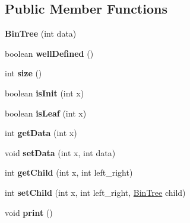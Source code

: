 \subsection*{Public Member Functions}
\begin{DoxyCompactItemize}
\item 
\mbox{\label{classdomini_1_1utils_1_1BinTree_a83904c6ebf931ba29a134be5f29a66c7}} 
{\bfseries Bin\+Tree} (int data)
\item 
\mbox{\label{classdomini_1_1utils_1_1BinTree_a742c520d5bff9a17a4cd56d833aa62c0}} 
boolean {\bfseries well\+Defined} ()
\item 
\mbox{\label{classdomini_1_1utils_1_1BinTree_a08e528b0f5bbebe0a5382be7f8e73a55}} 
int {\bfseries size} ()
\item 
\mbox{\label{classdomini_1_1utils_1_1BinTree_a6be9277eaecc3750a8aedfa045f8142b}} 
boolean {\bfseries is\+Init} (int x)
\item 
\mbox{\label{classdomini_1_1utils_1_1BinTree_a52ea101b3e66d5389a2350e6c777c517}} 
boolean {\bfseries is\+Leaf} (int x)
\item 
\mbox{\label{classdomini_1_1utils_1_1BinTree_a256937f5412ac463258c67b8190708ba}} 
int {\bfseries get\+Data} (int x)
\item 
\mbox{\label{classdomini_1_1utils_1_1BinTree_a35dbfcf3a00a10d46240ce6295d4454c}} 
void {\bfseries set\+Data} (int x, int data)
\item 
\mbox{\label{classdomini_1_1utils_1_1BinTree_ab44a6f728b74f5b3f0bd583d858de57e}} 
int {\bfseries get\+Child} (int x, int left\+\_\+right)
\item 
\mbox{\label{classdomini_1_1utils_1_1BinTree_a8efc5cd06c9e5bad98ab7da0bc72c1cf}} 
int {\bfseries set\+Child} (int x, int left\+\_\+right, \hyperlink{classdomini_1_1utils_1_1BinTree}{Bin\+Tree} child)
\item 
\mbox{\label{classdomini_1_1utils_1_1BinTree_ad8f921ac94ebe2a1007ed41b935099b1}} 
void {\bfseries print} ()
\end{DoxyCompactItemize}
